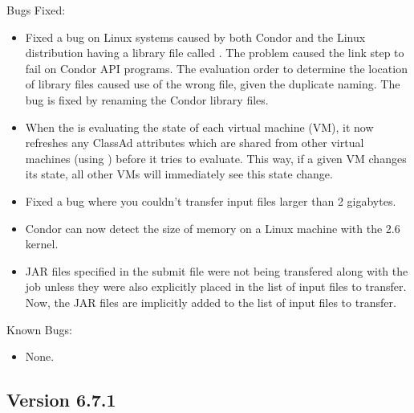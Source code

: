 \noindent Bugs Fixed:

\begin{itemize}

\item Fixed a bug on Linux systems caused by both 
      Condor and the Linux distribution having a library file 
      called .
      The problem caused the link step to fail on Condor API
      programs.
      The evaluation order to determine the location of library
      files caused use of the wrong file, given the duplicate naming.
      The bug is fixed by renaming the Condor library files.

\item When the  is evaluating the state of each virtual
  machine (VM), it now refreshes any ClassAd attributes which are
  shared from other virtual machines (using )
  before it tries to evaluate.
  This way, if a given VM changes its state, all other VMs will
  immediately see this state change.

\item Fixed a bug where you couldn't transfer input files larger than 2 gigabytes.

\item Condor can now detect the size of memory on a Linux machine with the 2.6
kernel.

\item JAR files specified in the submit file were not being transfered
along with the job unless they were also explicitly placed in the list
of input files to transfer. Now, the JAR files are implicitly added to the
list of input files to transfer.

\end{itemize}

\noindent Known Bugs:

\begin{itemize}

\item None.

\end{itemize}




\subsection*{\label{sec:New-6-7-1}Version 6.7.1}

